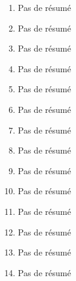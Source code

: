 \documentclass{article}
\begin{document}
\begin{enumerate}
    \item Pas de résumé
    \item Pas de résumé
    \item Pas de résumé
    \item Pas de résumé
    \item Pas de résumé
    \item Pas de résumé
    \item Pas de résumé
    \item Pas de résumé
    \item Pas de résumé
    \item Pas de résumé
    \item Pas de résumé
    \item Pas de résumé
    \item Pas de résumé
    \item Pas de résumé
\end{enumerate}
\end{document}

